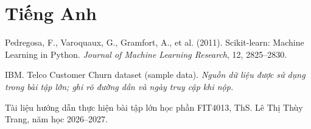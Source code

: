 
\section*{Tiếng Anh}
\begin{enumerate}[label={[\arabic*]}]
    \item Pedregosa, F., Varoquaux, G., Gramfort, A., et al. (2011). Scikit-learn: Machine Learning in Python.
    \textit{Journal of Machine Learning Research}, 12, 2825--2830.
    \item IBM. Telco Customer Churn dataset (sample data). \textit{Nguồn dữ liệu được sử dụng trong bài tập lớn; ghi rõ đường dẫn và ngày truy cập khi nộp.}
    \item Tài liệu hướng dẫn thực hiện bài tập lớn học phần FIT4013, ThS. Lê Thị Thùy Trang, năm học 2026--2027.
\end{enumerate}
